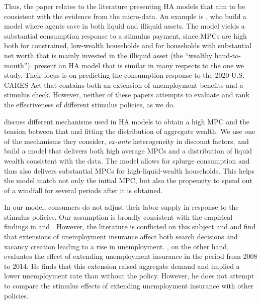 \documentclass[\econtexRoot/HAFiscal]{subfiles}
\begin{document}
Thus, the paper relates to the literature presenting HA models that aim to be consistent with the evidence from the micro-data. An example is \cite{kaplan2014model}, who build a model where agents save in both liquid and illiquid assets. The model yields a substantial consumption response to a stimulus payment, since MPCs are high both for constrained, low-wealth households and for households with substantial net worth that is mainly invested in the illiquid asset (the ``wealthy hand-to-mouth''). \cite{carroll2020modeling} present an HA model that is similar in many respects to the one we study. Their focus is on predicting the consumption response to the 2020 U.S. CARES Act that contains both an extension of unemployment benefits and a stimulus check. However, neither of these papers attempts to evaluate and rank the effectiveness of different stimulus policies, as we do.

\cite{kaplanMPC2022} discuss different mechanisms used in HA models to obtain a high MPC and the tension between that and fitting the distribution of aggregate wealth. We use one of the mechanisms they consider, \textit{ex-ante} heterogeneity in discount factors, and build a model that delivers both high average MPCs and a distribution of liquid wealth consistent with the data. The model allows for splurge consumption and thus also delivers substantial MPCs for high-liquid-wealth households. This helps the model match not only the initial MPC, but also the propensity to spend out of a windfall for several periods after it is obtained. 

In our model, consumers do not adjust their labor supply in response to the stimulus policies.  Our assumption is broadly consistent with the empirical findings in \cite{ganong2022spending} and \cite{chodorow2016limited}. However, the literature is conflicted on this subject and \cite{hagedorn2017impact} and \cite{hagedorn2019unemployment} find that extensions of unemployment insurance affect both search decisions and vacancy creation leading to a rise in unemployment. \cite{kekre2022unemp}, on the other hand, evaluates the effect of extending unemployment insurance in the period from 2008 to 2014. He finds that this extension raised aggregate demand and implied a lower unemployment rate than without the policy. However, he does not attempt to compare the stimulus effects of extending unemployment insurance with other policies.
\end{document}
